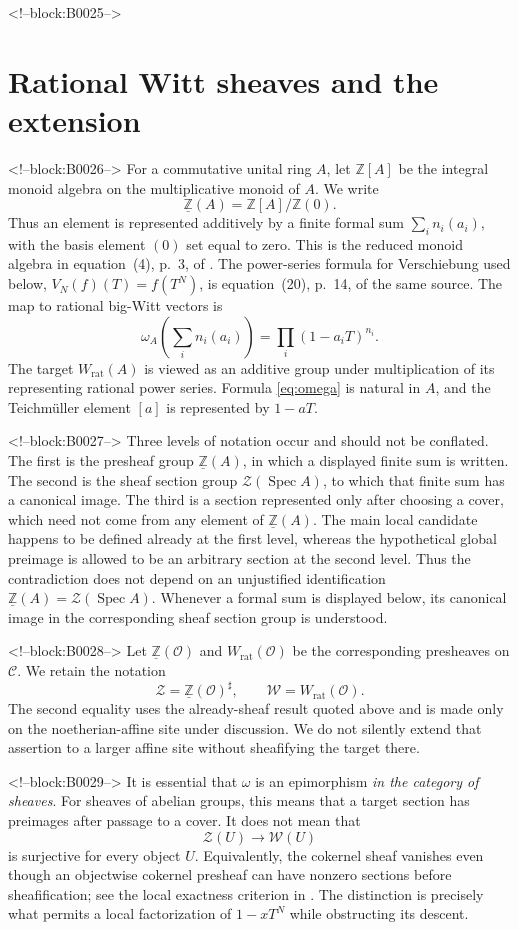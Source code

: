 \documentclass[11pt]{article}
\theoremstyle{definition}
\newcommand{\Spec}{\operatorname{Spec}}
\newcommand{\Wrat}{W_{\mathrm{rat}}}
\newcommand{\Zpre}{\underline{\mathbb Z}}
\newcommand{\Zsh}{\mathcal Z}
\newcommand{\Wsh}{\mathcal W}
\newcommand{\sh}{\sharp}
\begin{document}
<!--block:B0025-->
\section{Rational Witt sheaves and the extension}\label{sec:objects}

<!--block:B0026-->
For a commutative unital ring \(A\), let \(\mathbb Z[A]\) be the integral
monoid algebra on the multiplicative monoid of \(A\).  We write
\[
 \Zpre(A)=\mathbb Z[A]/\mathbb Z(0).
\]
Thus an element is represented additively by a finite formal sum
\(\sum_i n_i(a_i)\), with the basis element \((0)\) set equal to zero.
This is the reduced monoid algebra in equation~(4), p.~3, of
\cite{Deninger2025Rational}.  The power-series formula for Verschiebung used
below, \(V_N(f)(T)=f(T^N)\), is equation~(20), p.~14, of the same source.
The map to rational big-Witt vectors is
\[
 \omega_A\!\left(\sum_i n_i(a_i)\right)
   =\prod_i(1-a_iT)^{n_i}.
 \tag{2.1}\label{eq:omega}
\]
The target \(\Wrat(A)\) is viewed as an additive group under multiplication
of its representing rational power series.  Formula
\eqref{eq:omega} is natural in \(A\), and the Teichm\"uller element
\([a]\) is represented by \(1-aT\).

<!--block:B0027-->
Three levels of notation occur and should not be conflated.  The first is
the presheaf group \(\Zpre(A)\), in which a displayed finite sum is written.
The second is the sheaf section group
\(\Zsh(\Spec A)\), to which that finite sum has a canonical image.  The
third is a section represented only after choosing a cover, which need not
come from any element of \(\Zpre(A)\).  The main local candidate happens to
be defined already at the first level, whereas the hypothetical global
preimage is allowed to be an arbitrary section at the second level.  Thus
the contradiction does not depend on an unjustified identification
\(\Zpre(A)=\Zsh(\Spec A)\).
Whenever a formal sum is displayed below, its canonical image in the
corresponding sheaf section group is understood.

<!--block:B0028-->
Let \(\Zpre(\mathcal O)\) and \(\Wrat(\mathcal O)\) be the corresponding
presheaves on \(\mathscr C\).  We retain the notation
\[
 \Zsh=\Zpre(\mathcal O)^\sh,\qquad
 \Wsh=\Wrat(\mathcal O).
\]
The second equality uses the already-sheaf result quoted above and is made
only on the noetherian-affine site under discussion.  We do not silently
extend that assertion to a larger affine site without sheafifying the
target there.

<!--block:B0029-->
It is essential that \(\omega\) is an epimorphism \emph{in the category of
sheaves}.  For sheaves of abelian groups, this means that a target section
has preimages after passage to a cover.  It does not mean that
\[
 \Zsh(U)\longrightarrow\Wsh(U)
\]
is surjective for every object \(U\).  Equivalently, the cokernel sheaf
vanishes even though an objectwise cokernel presheaf can have nonzero
sections before sheafification; see the local exactness criterion in
\cite[Tag 03CN]{StacksProject}.  The distinction is precisely what permits
a local factorization of \(1-xT^N\) while obstructing its descent.
\end{document}
